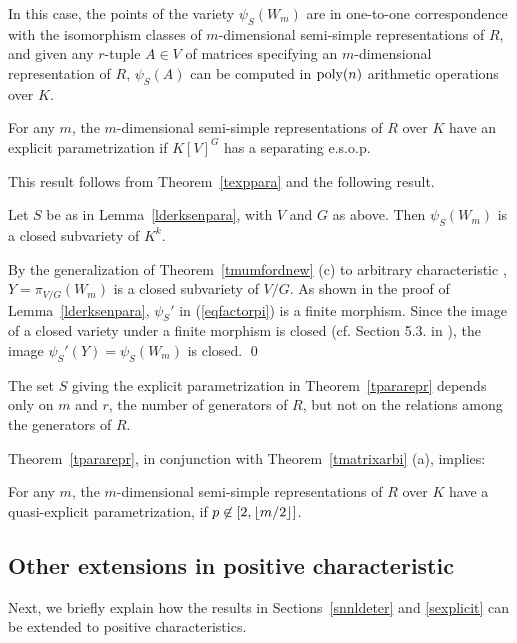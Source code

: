 \documentclass[11pt]{article}
\begin{document}
In this case, the points of the variety $\psi_S(W_m)$ are in one-to-one correspondence
with the isomorphism  classes of $m$-dimensional semi-simple representations of $R$,
and given any $r$-tuple $A \in V$ 
of matrices specifying an $m$-dimensional 
representation of $R$, $\psi_S(A)$ can be computed in ${\mbox {poly}}(n)$ arithmetic operations over $K$.

\begin{theorem} \label{tpararepr} \label{trepr1}
For any $m$, the $m$-dimensional semi-simple representations of $R$ over $K$
have an explicit parametrization if $K[V]^G$ has a separating e.s.o.p.
\end{theorem}

This result follows from Theorem~\ref{texppara} and the following result.

\begin{prop} \label{palgebra}
Let $S$ be as in Lemma~\ref{lderksenpara}, with $V$ and $G$ as above.
Then $\psi_S(W_m)$ is a closed subvariety of $K^k$.
\end{prop} 

\proof 
By the generalization of Theorem~\ref{tmumfordnew} (c) to
 arbitrary characteristic \cite{mumford},
$Y=\pi_{V/G}(W_m)$ is a closed subvariety of $V/G$. 
As shown in the proof of Lemma~\ref{lderksenpara}, $\psi_S'$ in 
 (\ref{eqfactorpi}) is a finite morphism.
Since the image of a closed variety under a finite morphism is closed
(cf. Section 5.3. in \cite{shafa}), 
the image $\psi_S'(Y)=\psi_S(W_m)$ is closed.
\qed 

 The set $S$ giving the explicit parametrization in Theorem~\ref{tpararepr}
depends only on $m$ and $r$, the number of generators of $R$, but  not on the  relations among the
generators of $R$.

Theorem~\ref{tpararepr}, in conjunction with 
Theorem~\ref{tmatrixarbi} (a), implies:

\begin{theorem} \label{trepr2}
For any $m$, the $m$-dimensional semi-simple representations of $R$ over $K$ have a quasi-explicit parametrization,
if  $p \not \in [2,{\lfloor m/2 \rfloor}]$.
\end{theorem}

\subsection{Other extensions in positive characteristic} \label{sposcharequi}
Next, we briefly explain how  the results in Sections~\ref{snnldeter} and \ref{sexplicit}
can be extended to   positive characteristics.
\end{document}
